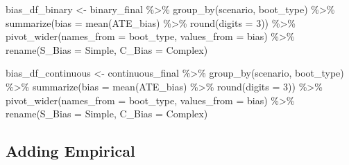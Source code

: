 \documentclass[
]{article}
\newenvironment{Shaded}{\begin{snugshade}}{\end{snugshade}}
\newcommand{\AttributeTok}[1]{\textcolor[rgb]{0.77,0.63,0.00}{#1}}
\newcommand{\DecValTok}[1]{\textcolor[rgb]{0.00,0.00,0.81}{#1}}
\newcommand{\FunctionTok}[1]{\textcolor[rgb]{0.00,0.00,0.00}{#1}}
\newcommand{\NormalTok}[1]{#1}
\newcommand{\OtherTok}[1]{\textcolor[rgb]{0.56,0.35,0.01}{#1}}
\newcommand{\SpecialCharTok}[1]{\textcolor[rgb]{0.00,0.00,0.00}{#1}}
\begin{document}
\begin{Shaded}
\begin{Highlighting}[]
\NormalTok{bias\_df\_binary }\OtherTok{\textless{}{-}}
\NormalTok{  binary\_final }\SpecialCharTok{\%\textgreater{}\%}
  \FunctionTok{group\_by}\NormalTok{(scenario, boot\_type) }\SpecialCharTok{\%\textgreater{}\%}
  \FunctionTok{summarize}\NormalTok{(}\AttributeTok{bias =} \FunctionTok{mean}\NormalTok{(ATE\_bias) }\SpecialCharTok{\%\textgreater{}\%} \FunctionTok{round}\NormalTok{(}\AttributeTok{digits =} \DecValTok{3}\NormalTok{)) }\SpecialCharTok{\%\textgreater{}\%}
  \FunctionTok{pivot\_wider}\NormalTok{(}\AttributeTok{names\_from =}\NormalTok{ boot\_type, }\AttributeTok{values\_from =}\NormalTok{ bias) }\SpecialCharTok{\%\textgreater{}\%} 
  \FunctionTok{rename}\NormalTok{(}\AttributeTok{S\_Bias =}\NormalTok{ Simple, }\AttributeTok{C\_Bias =}\NormalTok{ Complex)}

\NormalTok{bias\_df\_continuous }\OtherTok{\textless{}{-}}
\NormalTok{  continuous\_final }\SpecialCharTok{\%\textgreater{}\%}
  \FunctionTok{group\_by}\NormalTok{(scenario, boot\_type) }\SpecialCharTok{\%\textgreater{}\%}
  \FunctionTok{summarize}\NormalTok{(}\AttributeTok{bias =} \FunctionTok{mean}\NormalTok{(ATE\_bias) }\SpecialCharTok{\%\textgreater{}\%} \FunctionTok{round}\NormalTok{(}\AttributeTok{digits =} \DecValTok{3}\NormalTok{)) }\SpecialCharTok{\%\textgreater{}\%}
  \FunctionTok{pivot\_wider}\NormalTok{(}\AttributeTok{names\_from =}\NormalTok{ boot\_type, }\AttributeTok{values\_from =}\NormalTok{ bias) }\SpecialCharTok{\%\textgreater{}\%} 
  \FunctionTok{rename}\NormalTok{(}\AttributeTok{S\_Bias =}\NormalTok{ Simple, }\AttributeTok{C\_Bias =}\NormalTok{ Complex)}
\end{Highlighting}
\end{Shaded}

\hypertarget{adding-empirical}{%
\subsection{Adding Empirical}\label{adding-empirical}}
\end{document}
